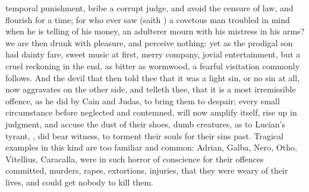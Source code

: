 {temporal punishment, bribe a corrupt judge, and avoid the censure
of law, and flourish for a time; for who ever saw (saith
\Chrysostom{}) a covetous man troubled in mind when he is telling of his
money, an adulterer mourn with his mistress in his arms? we are then
drunk with pleasure, and perceive nothing: yet as the prodigal son had
dainty fare, sweet music at first, merry company, jovial entertainment,
but a cruel reckoning in the end, as bitter as wormwood, a fearful
visitation commonly follows. And the devil that then told thee that it
was a light sin, or no sin at all, now aggravates on the other side,
and telleth thee, that it is a most irremissible offence, as he did by
Cain and Judas, to bring them to despair; every small circumstance
before neglected and contemned, will now amplify itself, rise up in
judgment, and accuse the dust of their shoes, dumb creatures, as to
Lucian's tyrant, , did bear
witness, to torment their souls for their sins past. Tragical examples
in this kind are too familiar and common: Adrian, Galba, Nero, Otho,
Vitellius, Caracalla, were in such horror of conscience for their
offences committed, murders, rapes, extortions, injuries, that they
were weary of their lives, and could get nobody to kill them.

}
